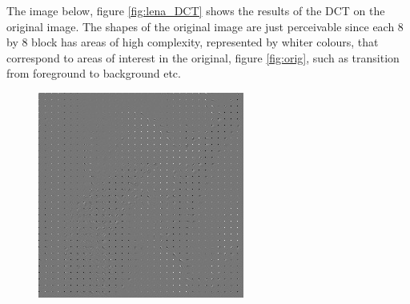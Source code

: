 The image below, figure \ref{fig:lena_DCT} shows the results of the DCT on the original image. The shapes of the original image are just perceivable since each 8 by 8 block has areas of high complexity, represented by whiter colours, that correspond to areas of interest in the original, figure \ref{fig:orig}, such as transition from foreground to background etc.
\begin{figure}[ht]
	\centering
	\begin{minipage}[c]{0.45\linewidth}
		\centering
	 	\includegraphics[width=\textwidth]{DCT_lena.jpg}
	\end{minipage}
	\begin{minipage}[c]{0.45\linewidth}
		\centering

\end{minipage}
\end{figure}

